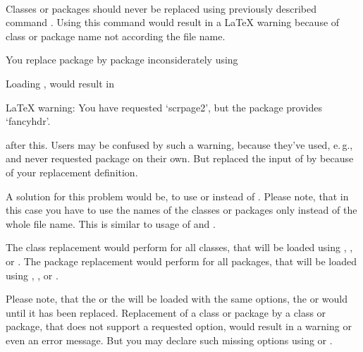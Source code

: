 \begin{Declaration}
                      \\
\end{Declaration}%
%
%
Classes or packages
should never be replaced using previously described command
. Using this command would result in a \LaTeX{} warning
because of class or package name not according the file name.
\begin{Example}
  You replace package  by package 
  inconsiderately using
\begin{lstcode}
\end{lstcode}
  Loading , would result in
\begin{lstcode}
  LaTeX warning: You have requested `scrpage2',
                 but the package provides `fancyhdr'.
\end{lstcode}
  after this. Users may be confused by such a warning, because they've used,
  e.\,g.,  and never requested package
   on their own. But  replaced the input
  of  by  because of your replacement
  definition.
\end{Example}
A solution for this problem would be, to use  or
 instead of . Please note, that in
this case you have to use the names of the classes or packages only instead of
the whole file name. This is similar to usage of  and
.

The class replacement would perform for all classes, that will be loaded using
, , or . The
package replacement would perform for all packages, that will be loaded using
, , or
.

Please note, that the  or the
 will be loaded with the same options, the
 or  would until it has been
replaced. Replacement of a class or package by a class or package, that
does not support a requested option, would result in a warning or even an error
message. But you may declare such missing options using  or
.

